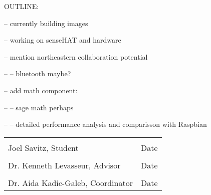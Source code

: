 \documentclass[12pt]{amsart}
\begin{document}
OUTLINE:

-- currently building images

-- working on senseHAT and hardware

-- mention northeastern collaboration potential

-- -- bluetooth maybe?

-- add math component:

-- -- sage math perhaps

-- -- detailed performance analysis and comparisson with Raspbian



\noindent\begin{tabular}{ll}
	\\[8ex]
	\makebox[4in]{\hrulefill} & \makebox[1.5in]{\hrulefill} \\
	Joel Savitz, Student & Date \\[8ex]
	\makebox[4in]{\hrulefill} & \makebox[1.5in]{\hrulefill} \\
	Dr. Kenneth Levasseur, Advisor & Date \\[8ex]
	\makebox[4in]{\hrulefill} & \makebox[1.5in]{\hrulefill} \\
	Dr. Aida Kadic-Galeb, Coordinator & Date \\[8ex]
\end{tabular}
\end{document}

